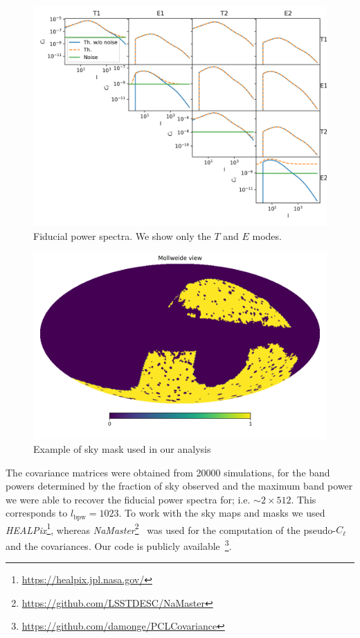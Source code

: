 \documentclass[useAMS,usenatbib]{mn2e}
\newcommand{\cl}{C_\ell}
\begin{document}
\begin{figure}
  \centering
  \includegraphics[width=\textwidth]{./figures/cls-sph-2b.png}
  \caption{Fiducial power spectra. We show only the $T$ and $E$ modes.}
  \label{fig:cl-2bins}
\end{figure}

\begin{figure}
  \centering
  \includegraphics[width=\columnwidth]{./figures/mask-lss1.png}
  \caption{Example of sky mask used in our analysis}
  \label{fig:mask}
\end{figure}

The covariance matrices were obtained from 20000 simulations, for the band
powers determined by the fraction of sky observed and the maximum band power
we were able to recover the fiducial power spectra for; i.e. $\sim 2 \times
512$. This corresponds to $l_{\mbox{bpw}} = 1023$. To work with the sky
maps and masks we used
\textit{HEALPix}\footnote{\url{https://healpix.jpl.nasa.gov/}}, whereas 
\textit{NaMaster}\footnote{\url{https://github.com/LSSTDESC/NaMaster}}~\cite{2018arXiv180909603A}
was used for the computation of the pseudo-$\cl$ and the covariances. Our code
is publicly
available~\footnote{\url{https://github.com/damonge/PCLCovariance}}.
\end{document}

